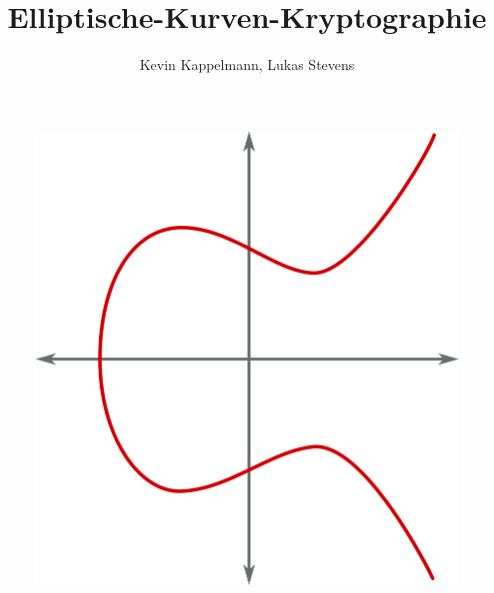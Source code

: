 \documentclass[hidelinks]{article}
\title{Elliptische-Kurven-Kryptographie}
\author{Kevin Kappelmann, Lukas Stevens}
\theoremstyle{plain}
\theoremstyle{definition}
\theoremstyle{rem}
\begin{document}
\maketitle
\vspace{6em}
\begin{figure}[H]
\centering
\includegraphics[scale=0.3]{cover}
\end{figure}

\newpage
\tableofcontents %
\listoffigures %
\listoftables %
\newpage

\end{document}
